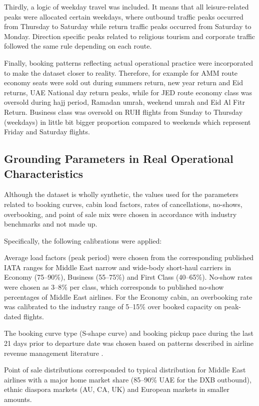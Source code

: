 Thirdly, a logic of weekday travel was included. It means that all leisure-related peaks were allocated certain weekdays, where outbound traffic peaks occurred from Thursday to Saturday while return traffic peaks occurred from Saturday to Monday. Direction specific peaks related to religious tourism and corporate traffic followed the same rule depending on each route.

Finally, booking patterns reflecting actual operational practice were incorporated to make the dataset closer to reality. Therefore, for example for AMM route economy seats were sold out during summers return, new year return and Eid returns, UAE National day return peaks, while for JED route economy class was oversold during hajj period, Ramadan umrah, weekend umrah and Eid Al Fitr Return. Business class was oversold on RUH flights from Sunday to Thursday (weekdays) in little bit bigger proportion compared to weekends which represent Friday and Saturday flights.

\subsection{Grounding Parameters in Real Operational Characteristics}
\label{sec:ch3:grounding}

Although the dataset is wholly synthetic, the values used for the parameters related to booking curves, cabin load factors, rates of cancellations, no-shows, overbooking, and point of sale mix were chosen in accordance with industry benchmarks and not made up.

Specifically, the following calibrations were applied:

Average load factors (peak period) were chosen from the corresponding published IATA ranges for Middle East narrow and wide-body short-haul carriers in Economy (75--90\%), Business (55--75\%) and First Class (40--65\%). No-show rates were chosen as 3--8\% per class, which corresponds to published no-show percentages of Middle East airlines. For the Economy cabin, an overbooking rate was calibrated to the industry range of 5--15\% over booked capacity on peak-dated flights.

The booking curve type (S-shape curve) and booking pickup pace during the last 21 days prior to departure date was chosen based on patterns described in airline revenue management literature \citep{Belobaba1987, Belobaba1989, LeeHersh1993, PakPiersma2002}.

Point of sale distributions corresponded to typical distribution for Middle East airlines with a major home market share (85--90\% UAE for the DXB outbound), ethnic diaspora markets (AU, CA, UK) and European markets in smaller amounts.

